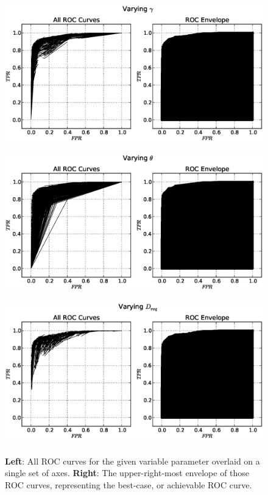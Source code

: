 \begin{figure}[!h]
\begin{center}
\includegraphics[height=2.5in]{../fig/final/roc_env/gamma}
\includegraphics[height=2.5in]{../fig/final/roc_env/theta}
\includegraphics[height=2.5in]{../fig/final/roc_env/dreq}
\end{center}
\caption{\label{fig:roc_env2} {\bf Left}: All ROC curves for the given variable
  parameter overlaid on a single set of axes. {\bf Right}: The upper-right-most
  envelope of those ROC curves, representing the best-case, or achievable ROC
  curve.  }
\end{figure}

